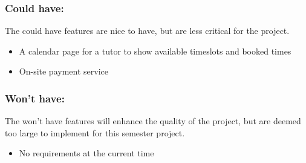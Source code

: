 \subsubsection{Could have:}
The could have features are nice to have, but are less critical for the project.

\begin{itemize}
    \item A calendar page for a tutor to show available timeslots and booked times
    \item On-site payment service
\end{itemize}

\subsubsection{Won't have:}
The won't have features will enhance the quality of the project, but are deemed too large to implement for this semester project.
\begin{itemize}
    \item No requirements at the current time
\end{itemize}
